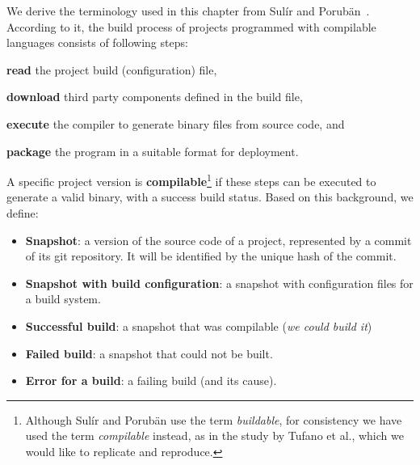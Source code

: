 We derive the terminology used in this chapter from Sul\'ir and Porubän~\cite{Sulir:2016:QSJ:3001878.3001882}. According to it, the build process of projects programmed with compilable languages consists of following steps:
\begin{inparaenum}[\bf(1)]
    \item \textbf{read} the project build (configuration) file,
    \item \textbf{download} third party components defined in the build file,
    \item \textbf{execute} the compiler to generate  binary files from source code, and
    \item \textbf{package} the program in a suitable format for deployment.
\end{inparaenum}

A specific project version is {\bf compilable}\footnote{Although Sul\'ir and Porubän use the term \textit{buildable}, for consistency we have used the term \textit{compilable} instead, as in the study by Tufano et al., which we would like to replicate and reproduce.} if these steps can be executed to generate a valid binary, with a success build status. Based on this background, we define:

\begin{itemize}
\item \textbf{Snapshot}: a version of the source code of a project, represented by a commit of its git repository. It will be identified by the unique hash of the commit.
\item \textbf{Snapshot with build configuration}: a snapshot with configuration files for a build system.
\item \textbf{Successful build}: a snapshot that was compilable (\emph{we could build it})
\item \textbf{Failed build}: a snapshot that could not be built.
\item \textbf{Error for a build}: a failing build (and its cause).
\end{itemize}
